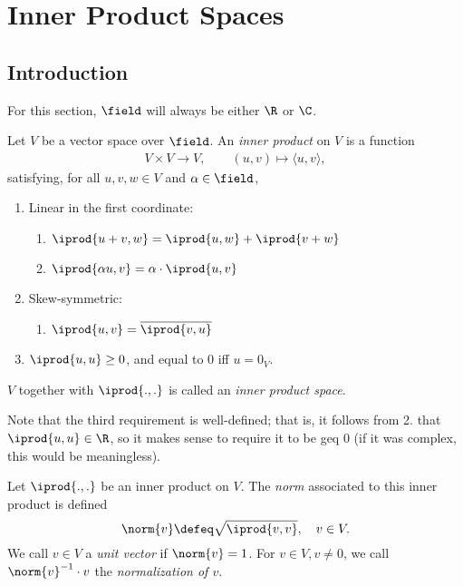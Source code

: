 \section{Inner Product Spaces}

\subsection{Introduction}

For this section, $\field$ will always be either $\R$ or $\C$.

\begin{definition}
    Let $V$ be a vector space over $\field$. An \emph{inner product} on $V$ is a function \begin{align*}
        V \times V  \to V, \qquad (u, v) \mapsto \langle u, v\rangle,
    \end{align*}
    satisfying, for all $u, v,w \in V$ and $\alpha \in \field$, 
    \begin{enumerate}
        \item Linear in the first coordinate:
        \begin{enumerate}
            \item $\iprod{u + v, w} = \iprod{u,w} + \iprod{v + w}$
            \item $\iprod{\alpha u, v} = \alpha \cdot \iprod{u, v}$
        \end{enumerate}
        \item Skew-symmetric:
        \begin{enumerate}
            \item $\iprod{u, v} = \overline{\iprod{v, u}}$
        \end{enumerate}
        \item $\iprod{u, u} \geq 0$, and equal to $0$ iff $u = 0_V$.
    \end{enumerate}
    $V$ together with $\iprod{.,.}$ is called an \emph{inner product space}.
\end{definition}

\begin{remark}
 Note that the third requirement is well-defined; that is, it follows from 2. that $\iprod{u,u} \in \R$, so it makes sense to require it to be geq 0 (if it was complex, this would be meaningless).
\end{remark}

\begin{definition}
    Let $\iprod{.,.}$ be an inner product on $V$. The \emph{norm} associated to this inner product is defined \[
    \norm{v} \defeq \sqrt{\iprod{v,v}}, \quad v \in V.
    \]
    We call $v \in V$ a \emph{unit vector} if $\norm{v} = 1$. For $v \in V, v \neq 0$, we call $\norm{v}^{-1} \cdot v$ the \emph{normalization of $v$}.
\end{definition}

